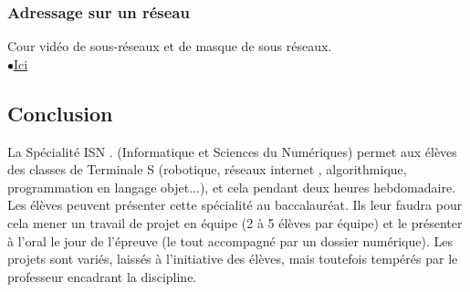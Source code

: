 \documentclass[a4paper, 12pt]{article}
\begin{document}
\subsubsection{Adressage sur un réseau}
Cour vidéo de sous-réseaux et de masque de sous réseaux.\\
\href{http://www.youtube.com/watch?v=zlzh1QcBb54}{$\bullet$Ici}
\begin{center}

\vfill
\section{Conclusion}
\end{center}
                La Spécialité ISN \cite{ISN4}. (Informatique et Sciences du Numériques) permet aux élèves des classes de Terminale S (robotique, réseaux internet \cite{ISN5}, algorithmique, programmation en langage objet...), et cela pendant deux heures hebdomadaire.
Les élèves peuvent présenter cette spécialité au baccalauréat. Ils leur faudra pour cela mener un travail de projet en équipe (2 à 5 élèves par équipe) et le présenter à l’oral le jour de l’épreuve (le tout accompagné par un dossier numérique).
Les projets sont variés, laissés à l’initiative des élèves, mais toutefois tempérés par le professeur encadrant la discipline.
\vfill

\newpage


	
\end{document}
